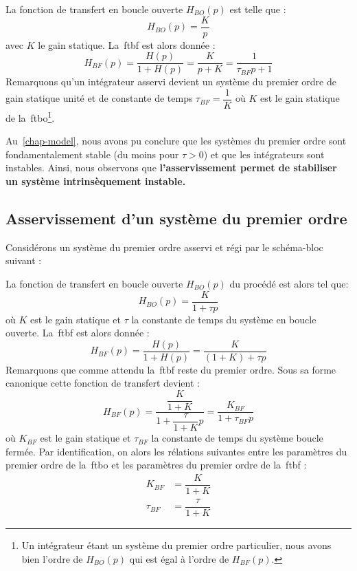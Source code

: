 La fonction de transfert en boucle ouverte $H_{BO}(p)$ est telle que :
$$
H_{BO}(p)=\dfrac{K}{p}
$$
avec $K$ le gain statique. 
La~\gls{ftbf} est alors donnée :
$$
H_{BF}(p)=\dfrac{H(p)}{1+H(p)}=\dfrac{K}{p+K}=\dfrac{1}{\tau_{BF} p+1}
$$
Remarquons qu'un intégrateur asservi devient un système du premier 
ordre de gain statique unité et de constante de temps $\tau_{BF}=\dfrac{1}{K}$ 
où $K$ est le gain statique de la~\gls{ftbo}\footnote{Un intégrateur étant 
un système du premier ordre particulier, nous avons bien l'ordre de $H_{BO}(p)$ 
qui est égal à l'ordre de $H_{BF}(p)$.}. 

Au~\cref{chap-model}, nous avons pu conclure que les systèmes du premier ordre 
sont fondamentalement stable (du moins pour $\tau>0$) et que les intégrateurs 
sont instables.
Ainsi, nous observons que \textbf{l'asservissement permet de stabiliser un 
système intrinsèquement instable.} 

\subsection{Asservissement d'un système du premier ordre}

Considérons un système du premier ordre asservi et régi par le schéma-bloc 
suivant :
\begin{center}
\end{center}
La fonction de transfert en boucle ouverte $H_{BO}(p)$ du procédé est alors 
tel que:
$$
H_{BO}(p)=\dfrac{K}{1+\tau p}
$$
où $K$ est le gain statique et $\tau$ la constante de temps 
du système en boucle ouverte. 
La~\gls{ftbf} est alors donnée :
$$
H_{BF}(p)=\dfrac{H(p)}{1+H(p)}=\dfrac{K}{(1+K)+\tau p}
$$
Remarquons que comme attendu la~\gls{ftbf} reste du premier ordre. 
Sous sa forme canonique cette fonction de transfert devient :
$$
H_{BF}(p)=\dfrac{\dfrac{K}{1+K}}{1+\dfrac{\tau}{1+K}p}
=\dfrac{K_{BF}}{1+\tau_{BF} p}
$$
où $K_{BF}$ est le gain statique et $\tau_{BF}$ la constante de temps du 
système boucle fermée. Par identification, on alors les rélations suivantes 
entre les paramètres du premier ordre de la~\gls{ftbo} et les paramètres du 
premier ordre de la~\gls{ftbf} :
\begin{align*}
       K_{BF}&=\dfrac{K}{1+K}\\
    \tau_{BF}&=\dfrac{\tau}{1+K}
\end{align*}

